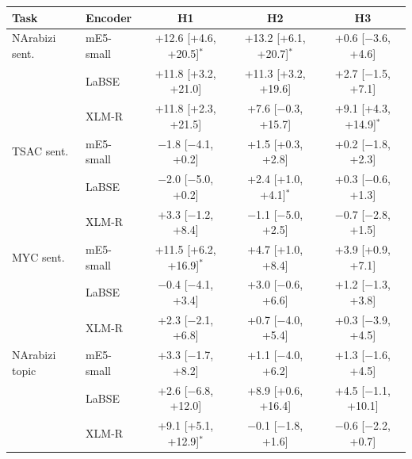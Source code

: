 \begin{tabular}{llccc}
\toprule
Task & Encoder & H1 & H2 & H3 \\
\midrule
NArabizi sent. & mE5-small & +12.6 [+4.6, +20.5]$^{*}$ & +13.2 [+6.1, +20.7]$^{*}$ & +0.6 [$-$3.6, +4.6] \\
 & LaBSE & +11.8 [+3.2, +21.0] & +11.3 [+3.2, +19.6] & +2.7 [$-$1.5, +7.1] \\
 & XLM-R & +11.8 [+2.3, +21.5] & +7.6 [$-$0.3, +15.7] & +9.1 [+4.3, +14.9]$^{*}$ \\
TSAC sent. & mE5-small & $-$1.8 [$-$4.1, +0.2] & +1.5 [+0.3, +2.8] & +0.2 [$-$1.8, +2.3] \\
 & LaBSE & $-$2.0 [$-$5.0, +0.2] & +2.4 [+1.0, +4.1]$^{*}$ & +0.3 [$-$0.6, +1.3] \\
 & XLM-R & +3.3 [$-$1.2, +8.4] & $-$1.1 [$-$5.0, +2.5] & $-$0.7 [$-$2.8, +1.5] \\
MYC sent. & mE5-small & +11.5 [+6.2, +16.9]$^{*}$ & +4.7 [+1.0, +8.4] & +3.9 [+0.9, +7.1] \\
 & LaBSE & $-$0.4 [$-$4.1, +3.4] & +3.0 [$-$0.6, +6.6] & +1.2 [$-$1.3, +3.8] \\
 & XLM-R & +2.3 [$-$2.1, +6.8] & +0.7 [$-$4.0, +5.4] & +0.3 [$-$3.9, +4.5] \\
NArabizi topic & mE5-small & +3.3 [$-$1.7, +8.2] & +1.1 [$-$4.0, +6.2] & +1.3 [$-$1.6, +4.5] \\
 & LaBSE & +2.6 [$-$6.8, +12.0] & +8.9 [+0.6, +16.4] & +4.5 [$-$1.1, +10.1] \\
 & XLM-R & +9.1 [+5.1, +12.9]$^{*}$ & $-$0.1 [$-$1.8, +1.6] & $-$0.6 [$-$2.2, +0.7] \\
\bottomrule
\end{tabular}

